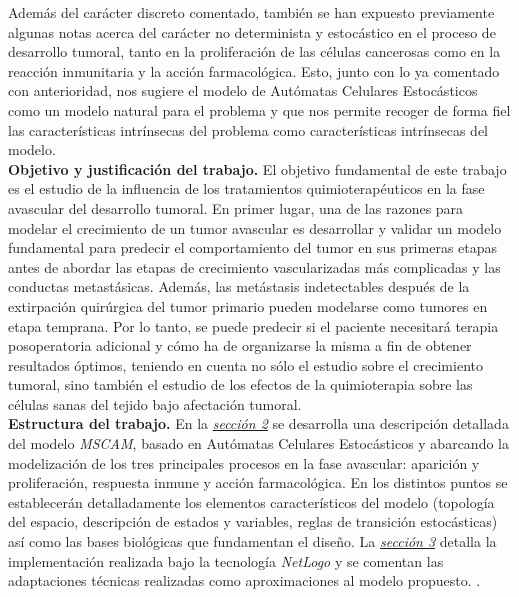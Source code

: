 Además del carácter discreto comentado, también se han expuesto previamente algunas notas acerca del carácter no determinista y estocástico en el proceso de desarrollo tumoral, tanto en la proliferación de las células cancerosas como en la reacción inmunitaria y la acción farmacológica. Esto, junto con lo ya comentado con anterioridad, nos sugiere el modelo de Autómatas Celulares Estocásticos \cite{Dobrushin1990} como un modelo natural para el problema y que nos permite recoger de forma fiel las características intrínsecas del problema como características intrínsecas del modelo.\\

\textbf{Objetivo y justificación del trabajo.} El objetivo fundamental de este trabajo es el estudio de la influencia de los tratamientos quimioterapéuticos en la fase avascular del desarrollo tumoral. En primer lugar, una de las razones para modelar el crecimiento de un tumor avascular es desarrollar y validar un modelo fundamental para predecir el comportamiento del tumor en sus primeras etapas antes de abordar las etapas de crecimiento vascularizadas más complicadas y las conductas metastásicas. Además, las metástasis indetectables después de la extirpación quirúrgica del tumor primario pueden modelarse como tumores en etapa temprana. Por lo tanto, se puede predecir si el paciente necesitará terapia posoperatoria adicional y cómo ha de organizarse la misma a fin de obtener resultados óptimos, teniendo en cuenta no sólo el estudio sobre el crecimiento tumoral, sino también el estudio de los efectos de la quimioterapia sobre las células sanas del tejido bajo afectación tumoral.\\

\textbf{Estructura del trabajo.} En la \hyperref[sec:model]{\textit{sección 2}} se desarrolla una descripción detallada del modelo \textit{MSCAM}, basado en Autómatas Celulares Estocásticos y abarcando la modelización de los tres principales procesos en la fase avascular: aparición y proliferación, respuesta inmune y acción farmacológica. En los distintos puntos se establecerán detalladamente los elementos característicos del modelo (topología del espacio, descripción de estados y variables, reglas de transición estocásticas) así como las bases biológicas que fundamentan el diseño. La \hyperref[sec:impl]{\textit{sección 3}} detalla la implementación realizada bajo la tecnología \textit{NetLogo} y se comentan las adaptaciones técnicas realizadas como aproximaciones al modelo propuesto. .


